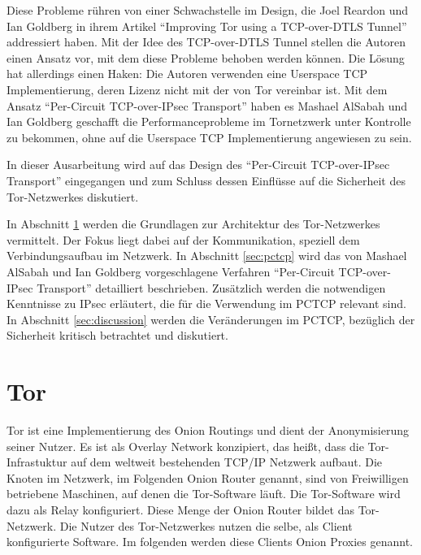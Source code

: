 \documentclass[fleqn,envcountsame,runningheads,10pt,a4paper]{llncs}
\begin{document}
Diese Probleme rühren von einer Schwachstelle im Design, die Joel Reardon und 
Ian Goldberg in ihrem Artikel ``Improving Tor using a TCP-over-DTLS 
Tunnel'' addressiert haben. Mit der Idee des TCP-over-DTLS Tunnel stellen die 
Autoren einen Ansatz vor, mit dem diese Probleme behoben werden können. Die 
Lösung hat allerdings einen Haken: Die Autoren verwenden eine Userspace TCP 
Implementierung, deren Lizenz nicht mit der von Tor vereinbar ist. Mit 
dem Ansatz ``Per-Circuit TCP-over-IPsec Transport'' haben es Mashael AlSabah und 
Ian Goldberg geschafft die Performanceprobleme im Tornetzwerk unter Kontrolle zu 
bekommen, ohne auf die Userspace TCP Implementierung angewiesen zu sein.

In dieser Ausarbeitung wird auf das Design des ``Per-Circuit TCP-over-IPsec 
Transport'' eingegangen und zum Schluss dessen Einflüsse auf die Sicherheit des 
Tor-Netzwerkes diskutiert.

In Abschnitt \ref{sec:tor} werden die Grundlagen zur Architektur des 
Tor-Netzwerkes vermittelt. Der Fokus liegt dabei auf der Kommunikation, 
speziell dem Verbindungsaufbau im Netzwerk. In Abschnitt \ref{sec:pctcp} wird 
das von Mashael AlSabah und Ian Goldberg vorgeschlagene Verfahren ``Per-Circuit 
TCP-over-IPsec Transport'' detailliert beschrieben. Zusätzlich werden die 
notwendigen Kenntnisse zu IPsec erläutert, die für die Verwendung im PCTCP 
relevant sind. In Abschnitt \ref{sec:discussion} werden die Veränderungen im 
PCTCP, bezüglich der Sicherheit kritisch betrachtet und diskutiert.

\newpage

\section{Tor}
\label{sec:tor}

Tor ist eine Implementierung des Onion Routings und dient der 
Anonymisierung seiner Nutzer. Es ist als Overlay Network konzipiert, das heißt, 
dass die Tor-Infrastuktur auf dem weltweit bestehenden TCP/IP Netzwerk 
aufbaut. Die Knoten im Netzwerk, im Folgenden Onion Router genannt, sind von 
Freiwilligen betriebene Maschinen, auf denen die Tor-Software läuft. 
Die Tor-Software wird dazu als Relay konfiguriert. Diese Menge der 
Onion Router bildet das Tor-Netzwerk. Die Nutzer des 
Tor-Netzwerkes nutzen die selbe, als Client konfigurierte Software. Im 
folgenden werden diese Clients Onion Proxies genannt.
\end{document}
